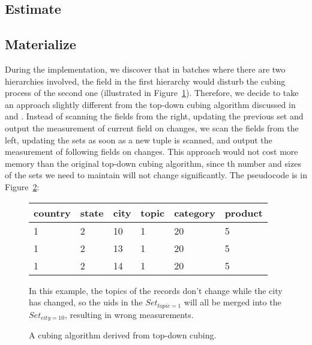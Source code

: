 \documentclass{article}
\begin{document}
\paragraph{}

\subsection{Estimate}

\subsection{Materialize}

During the implementation, we discover that in batches where there are two hierarchies involved, the field in the first hierarchy would disturb the cubing process of the second one (illustrated in Figure~\ref{fig:interrupt}). Therefore, we decide to take an approach slightly different from the top-down cubing algorithm discussed in \cite{aggregate1} and \cite{aggregate2}. Instead of scanning the fields from the right, updating the previous set and output the measurement of current field on changes, we scan the fields from the left, updating the sets as soon as a new tuple is scanned, and output the measurement of following fields on changes. This approach would not cost more memory than the original top-down cubing algorithm, since th number and sizes of the sets we need to maintain will not change significantly. The pseudocode is in Figure~\ref{cubeal}:

\begin{figure}[H]
\centering
\begin{tabular}{l l l l l l}
country & state & city & topic & category & product \\
\hline
1 & 2 & 10 & 1 & 20 & 5 \\
1 & 2 & 13 & 1 & 20 & 5 \\
1 & 2 & 14 & 1 & 20 & 5
\end{tabular}

\caption{In this example, the topics of the records don't change while the city has changed, so the uids in the $Set_{topic=1}$ will all be merged into the $Set_{city=10}$, resulting in wrong measurements.}
\label{fig:interrupt}

\end{figure}

\begin{figure}[H]

\centering
\caption{A cubing algorithm derived from top-down cubing.}
\label{cubeal}
\end{figure}
\end{document}
